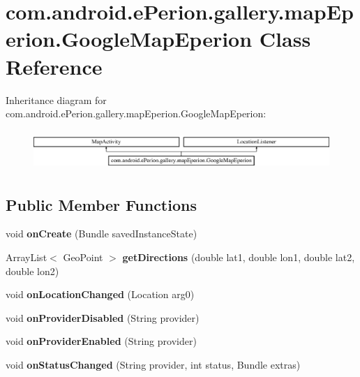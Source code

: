 \section{com.\-android.\-e\-Perion.\-gallery.\-map\-Eperion.\-Google\-Map\-Eperion Class Reference}
\label{classcom_1_1android_1_1e_perion_1_1gallery_1_1map_eperion_1_1_google_map_eperion}
Inheritance diagram for com.\-android.\-e\-Perion.\-gallery.\-map\-Eperion.\-Google\-Map\-Eperion\-:\begin{figure}[H]
\begin{center}
\leavevmode
\includegraphics[height=1.534247cm]{classcom_1_1android_1_1e_perion_1_1gallery_1_1map_eperion_1_1_google_map_eperion}
\end{center}
\end{figure}
\subsection*{Public Member Functions}
\begin{DoxyCompactItemize}
\item 
void {\bfseries on\-Create} (Bundle saved\-Instance\-State)\label{classcom_1_1android_1_1e_perion_1_1gallery_1_1map_eperion_1_1_google_map_eperion_a9fdeddca34d891ca16a47ff03ef57aa6}

\item 
Array\-List$<$ Geo\-Point $>$ {\bf get\-Directions} (double lat1, double lon1, double lat2, double lon2)
\item 
void {\bfseries on\-Location\-Changed} (Location arg0)\label{classcom_1_1android_1_1e_perion_1_1gallery_1_1map_eperion_1_1_google_map_eperion_a2978b1ff87a019ae75a6ea65851457ef}

\item 
void {\bfseries on\-Provider\-Disabled} (String provider)\label{classcom_1_1android_1_1e_perion_1_1gallery_1_1map_eperion_1_1_google_map_eperion_a90580608265ad961fc3c42898f5dce55}

\item 
void {\bfseries on\-Provider\-Enabled} (String provider)\label{classcom_1_1android_1_1e_perion_1_1gallery_1_1map_eperion_1_1_google_map_eperion_ac66d97e9e13d6196f4223b2b3b7a240d}

\item 
void {\bfseries on\-Status\-Changed} (String provider, int status, Bundle extras)\label{classcom_1_1android_1_1e_perion_1_1gallery_1_1map_eperion_1_1_google_map_eperion_acb009e44cbf528ded323b6ebff86995c}

\end{DoxyCompactItemize}
